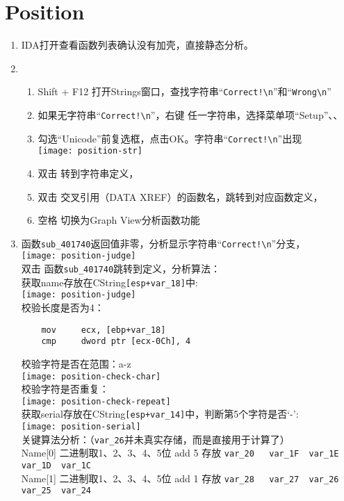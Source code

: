 \section{Position}
\begin{enumerate}
\item IDA打开查看函数列表确认没有加壳，直接静态分析。\\
\item 
	\begin{enumerate}
	\item Shift + F12 打开Strings窗口，查找字符串“\lstinline$Correct!\n$”和“\lstinline$Wrong\n$”\\
	\item 如果无字符串“\lstinline$Correct!\n$”，右键 任一字符串，选择菜单项“Setup”、、
	\item 勾选“Unicode”前复选框，点击OK。字符串“\lstinline$Correct!\n$”出现\\
		\texttt{[image: position-str]} \\
	\item 双击 转到字符串定义，\\
	\item 双击 交叉引用（DATA XREF）的函数名，跳转到对应函数定义，\\
	\item 空格 切换为Graph View分析函数功能 \\
	\end{enumerate} 
\item 
	 函数\lstinline$sub_401740$返回值非零，分析显示字符串“\lstinline$Correct!\n$”分支，\\
	\texttt{[image: position-judge]} \\
	双击 函数\lstinline$sub_401740$跳转到定义，分析算法： \\
	获取name存放在CString\lstinline$[esp+var_18]$中:\\
	\texttt{[image: position-judge]} \\
	校验长度是否为4：\\
	\begin{lstlisting}
	mov     ecx, [ebp+var_18]
	cmp     dword ptr [ecx-0Ch], 4
	\end{lstlisting}
	校验字符是否在范围：a-z \\
	\texttt{[image: position-check-char]} \\
	校验字符是否重复：\\
	\texttt{[image: position-check-repeat]} \\
	获取serial存放在CString\lstinline$[esp+var_14]$中，判断第5个字符是否‘-’:\\
	\texttt{[image: position-serial]} \\
	关键算法分析：（\lstinline$var_26$并未真实存储，而是直接用于计算了）\\
Name[0]		二进制取1、2、3、4、5位 add 5 存放	\lstinline$var_20	var_1F	var_1E	var_1D	var_1C$\\
Name[1]		二进制取1、2、3、4、5位 add 1 存放	\lstinline$var_28	var_27	var_26	var_25	var_24$\\


\end{enumerate}

